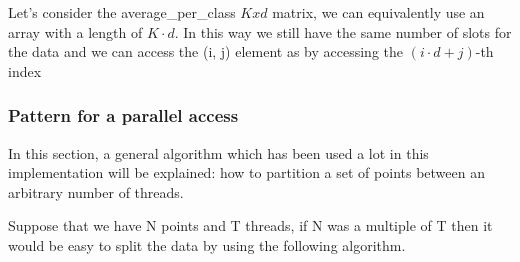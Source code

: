 \documentclass{report}
\begin{document}
{\begin{minipage}[b]{0.48\textwidth}
  Let's consider the average\_per\_class $Kxd$ matrix, we can equivalently use an array with a length of $K\cdot d$. In this way we still have the same number of slots for the data and we can access the (i, j) element as by accessing the $(i \cdot d + j)$-th index

  \subsubsection*{Pattern for a parallel access}
  In this section, a general algorithm which has been used a lot in this implementation will be explained: how to partition a set of points between an arbitrary number of threads.

  Suppose that we have N points and T threads, if N was a multiple of T then it would be easy to split the data by using the following algorithm.
\end{minipage}}

\newpage
\end{document}

